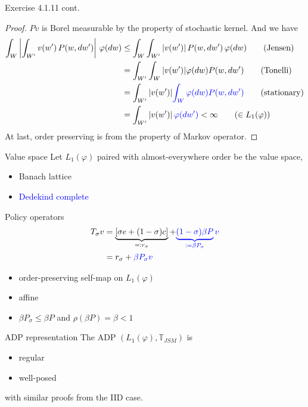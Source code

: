 \begin{frame}{Exercise 4.1.11 cont.}
    \begin{proof}
        $Pv$ is Borel measurable by the property of stochastic kernel. And we have
        \begin{align*}
            \int_{W}\left|\int_{W'} v(w')\, P(w, dw')\right|\,\varphi(dw)&\le \int_{W}\int_{W'}|v(w')|\, P(w,dw')\, \varphi(dw)\tag{Jensen}\\
            &= \int_{W'}\int_W|v(w')|\varphi(dw)P(w,dw')\tag{Tonelli}\\
            &= \int_{W'}|v(w')|\textcolor{blue}{\int_W \varphi(dw)P(w,dw')}\tag{stationary}\\
            &= \int_{W'}|v(w')|\,\textcolor{blue}{\varphi(dw')} <\infty\tag{$\in L_1(\varphi)$}
        \end{align*}
    At last, order preserving is from the property of Markov operator.
    \end{proof}
\end{frame}


\begin{frame}{Value space}
Let $L_1(\varphi)$ paired with almost-everywhere order be the value space,
\begin{itemize}
    \item Banach lattice
    \item \textcolor{blue}{Dedekind complete}
\end{itemize}
\end{frame}

\begin{frame}{Policy operators}
\begin{align*}
    T_\sigma v &= \underbrace{[\sigma e+(1-\sigma)c]}_{=:r_\sigma} + \textcolor{blue}{\underbrace{(1-\sigma)\beta P}_{:=\beta P_\sigma}v}\\
    &= r_\sigma +\textcolor{blue}{\beta P_\sigma v}
\end{align*}
\begin{itemize}
    \item order-preserving self-map on $L_1(\varphi)$
    \item affine
    \item $\beta P_\sigma  \le \beta P$ and $\rho(\beta P) =\beta<1$
\end{itemize}
\end{frame}

\begin{frame}{ADP representation}
The ADP $(L_1(\varphi), \mathbb{T}_{JSM})$ is
    \begin{itemize}
        \item regular
        \item well-posed
    \end{itemize}
with similar proofs from the IID case.   
\end{frame}

